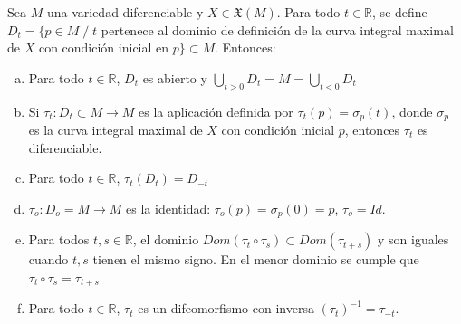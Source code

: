 \begin{teo}
Sea $M$ una variedad diferenciable y $X \in \mathfrak{X}(M)$. Para todo $t \in \mathbb{R}$, se define $D_t = \{p \in M \;/\; t$ pertenece al dominio de definición de la curva integral maximal de $X$ con condición inicial en $p\} \subset M$. Entonces:
\begin{enumerate}[a)]
    \item Para todo $t \in \mathbb{R}$, $D_t$ es abierto y $\underset{t > 0}{\bigcup} D_t = M = \underset{t < 0}{\bigcup} D_t$
    \item Si $\tau_t:D_t \subset M \to M$ es la aplicación definida por $\tau_t(p) = \sigma_p(t)$, donde $\sigma_p$ es la curva integral maximal de $X$ con condición inicial $p$, entonces $\tau_t$ es diferenciable.
    \item Para todo $t\in \mathbb{R}$, $\tau_t(D_t) = D_{-t}$
    \item $\tau_o : D_o = M \to M$ es la identidad: $\tau_o(p) = \sigma_p(0) = p$, $\tau_o=Id$.
    \item Para todos $t,s \in \mathbb{R}$, el dominio $Dom(\tau_t\circ \tau_s
    ) \subset Dom(\tau_{t+s})$ y son iguales cuando $t,s$ tienen el mismo signo. En el menor dominio se cumple que $\tau_t \circ \tau_s = \tau_{t+s}$
    \item Para todo $t \in \mathbb{R}$, $\tau_t$ es un difeomorfismo con inversa $(\tau_t)^{-1} = \tau_{-t}$.
\end{enumerate}
\end{teo}


